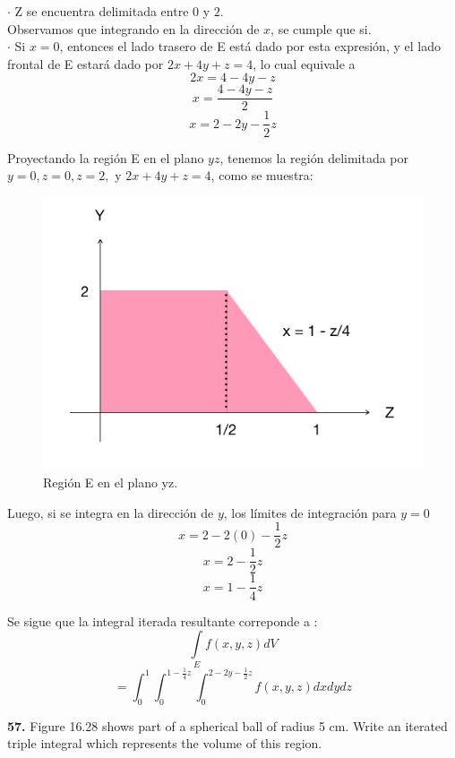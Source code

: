 \documentclass[11pt]{report}
\begin{document}
$\cdot$ Z se encuentra delimitada entre $0$ y $2$.\\
	Observamos que integrando en la dirección de $x$, se cumple que si.\\

$\cdot$ Si $x = 0$, entonces el lado trasero de E está dado por esta expresión,
	y el lado frontal de E estará dado por $2x + 4y + z = 4$, lo cual equivale a
		$$ 2x = 4 - 4y - z $$
		$$ x = \frac{4 - 4y - z}{2} $$
		$$ x = 2 - 2y - \frac{1}{2}z $$

Proyectando la región E en el plano $yz$, tenemos la región delimitada por
$y = 0, z = 0, z = 2,$ y $2x + 4y + z = 4$, como se muestra:

\begin{figure}[H]
	\includegraphics[scale=0.3]{trapezoid.png}
	\centering
	\caption{Región E en el plano yz.}
	\centering
\end{figure}


Luego, si se integra en la dirección de $y$, los límites de integración para $y = 0$
	$$ x = 2 - 2(0) - \frac{1}{2}z $$
	$$ x = 2 - \frac{1}{2}z $$
	$$ x = 1 - \frac{1}{4}z $$

Se sigue que la integral iterada resultante correponde a :
	$$ \int\limits_{E} f(x,y,z) dV  $$
	$$ = \int_{0}^{1}\int_{0}^{1 - \frac{1}{4}z}
		 \int_{0}^{2 - 2y - \frac{1}{2}z} f(x,y,z) dxdydz  $$

\textbf{57.} Figure 16.28 shows part of a spherical ball of radius 5 cm.
Write an iterated triple integral which represents the volume of this region. \\

\begin{figure}[h]
\centering
\end{figure}
\end{document}
